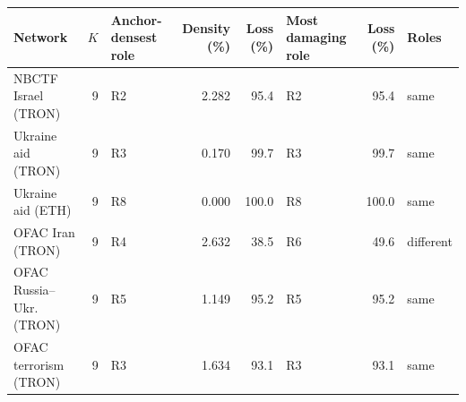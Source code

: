 \begin{tabular}{lrlrrlrl}
\toprule
\textbf{Network} & $K$ & \textbf{Anchor-densest role} & \textbf{Density (\%)} & \textbf{Loss (\%)} & \textbf{Most damaging role} & \textbf{Loss (\%)} & \textbf{Roles} \\
\midrule
NBCTF Israel (TRON) & 9 & R2 & 2.282 & 95.4 & R2 & 95.4 & same \\
Ukraine aid (TRON) & 9 & R3 & 0.170 & 99.7 & R3 & 99.7 & same \\
Ukraine aid (ETH) & 9 & R8 & 0.000 & 100.0 & R8 & 100.0 & same \\
OFAC Iran (TRON) & 9 & R4 & 2.632 & 38.5 & R6 & 49.6 & different \\
OFAC Russia--Ukr. (TRON) & 9 & R5 & 1.149 & 95.2 & R5 & 95.2 & same \\
OFAC terrorism (TRON) & 9 & R3 & 1.634 & 93.1 & R3 & 93.1 & same \\
\bottomrule
\end{tabular}
